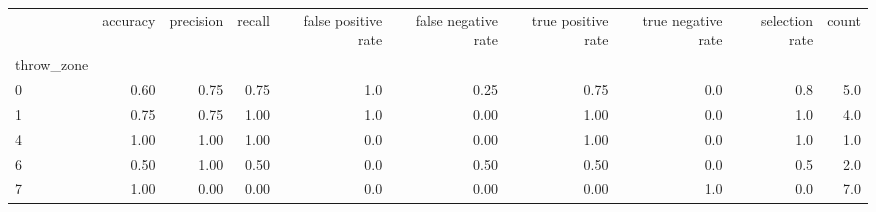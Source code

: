 \begin{tabular}{lrrrrrrrrr}
\toprule
{} &  accuracy &  precision &  recall &  false positive rate &  false negative rate &  true positive rate &  true negative rate &  selection rate &  count \\
throw\_zone &           &            &         &                      &                      &                     &                     &                 &        \\
\midrule
0          &      0.60 &       0.75 &    0.75 &                  1.0 &                 0.25 &                0.75 &                 0.0 &             0.8 &    5.0 \\
1          &      0.75 &       0.75 &    1.00 &                  1.0 &                 0.00 &                1.00 &                 0.0 &             1.0 &    4.0 \\
4          &      1.00 &       1.00 &    1.00 &                  0.0 &                 0.00 &                1.00 &                 0.0 &             1.0 &    1.0 \\
6          &      0.50 &       1.00 &    0.50 &                  0.0 &                 0.50 &                0.50 &                 0.0 &             0.5 &    2.0 \\
7          &      1.00 &       0.00 &    0.00 &                  0.0 &                 0.00 &                0.00 &                 1.0 &             0.0 &    7.0 \\
\bottomrule
\end{tabular}
